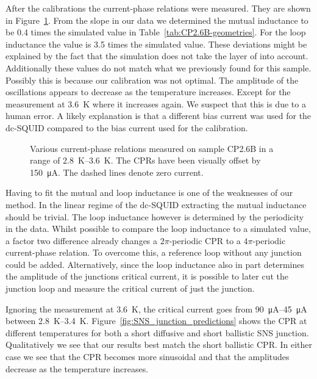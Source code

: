 After the calibrations the current-phase relations were measured. They are shown in Figure~\ref{fig:CP2.6B_revisited_CPRs}. From the slope in our data we determined the mutual inductance to be 0.4 times the simulated value in Table~\ref{tab:CP2.6B-geometries}. For the loop inductance the value is 3.5 times the simulated value. These deviations might be explained by the fact that the simulation does not take the layer of  into account. Additionally these values do not match what we previously found for this sample. Possibly this is because our calibration was not optimal. The amplitude of the oscillations appears to decrease as the temperature increases. Except for the measurement at \qty{3.6}{\kelvin} where it increases again. We suspect that this is due to a human error. A likely explanation is that a different bias current was used for the dc-SQUID compared to the bias current used for the calibration.

\begin{figure}[ht!]
	\centering
	
	\caption{Various current-phase relations measured on sample CP2.6B in a range of \qtyrange{2.8}{3.6}{\kelvin}. The CPRs have been visually offset by \qty{150}{\micro\ampere}. The dashed lines denote zero current.}
	\label{fig:CP2.6B_revisited_CPRs}
\end{figure}

Having to fit the mutual and loop inductance is one of the weaknesses of our method. In the linear regime of the dc-SQUID extracting the mutual inductance should be trivial. The loop inductance however is determined by the periodicity in the data. Whilst possible to compare the loop inductance to a simulated value, a factor two difference already changes a $2\pi$-periodic CPR to a $4\pi$-periodic current-phase relation. To overcome this, a reference loop without any junction could be added. Alternatively, since the loop inductance also in part determines the amplitude of the junctions critical current, it is possible to later cut the junction loop and measure the critical current of just the junction.

Ignoring the measurement at \qty{3.6}{\kelvin}, the critical current goes from \qtyrange{90}{45}{\micro\ampere} between \qtyrange{2.8}{3.4}{\kelvin}. Figure~\ref{fig:SNS_junction_predictions} shows the CPR at different temperatures for both a short diffusive and short ballistic SNS junction. Qualitatively we see that our results best match the short ballistic CPR. In either case we see that the CPR becomes more sinusoidal and that the amplitudes decrease as the temperature increases.

